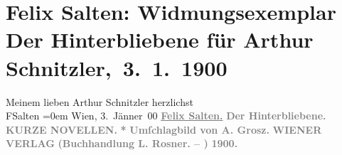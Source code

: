 

         
         \renewcommand{\erwaehntePersonen}{Personen: Adolf Grosz, Felix Salten}
         \renewcommand{\erwaehnteInstitutionen}{Institutionen: Buchhandlung L. Rosner, Wiener Verlag}
         \renewcommand{\erwaehnteOrte}{Orte: Wien}
         \renewcommand{\erwaehnteWerke}{Werke: Der Hinterbliebene. Kurze Novellen}
               \section[ Felix Salten: Widmungsexemplar Der Hinterbliebene für Arthur Schnitzler, 3. 1. 1900]{ Felix Salten: Widmungsexemplar Der Hinterbliebene für Arthur
               Schnitzler, 3. 1. 1900}\nopagebreak{}\rehead{ }\begin{ledgroupsized}[t]{13cm}\normalsize\beginnumbering \toendnotes[C]{\smallbreak\pagebreak[2]} 
\toendnotes[C]{\smallbreak}\pstart
           \noindent{}{\pb}Meinem lieben Arthur Schnitzler\pend
           \pstart
           herzlichst{\\[\baselineskip]}\spacefill\mbox{FSalten}\pend
           \leftskip=0em{}\pstart
           Wien, 3. Jänner 00\pend
           {\bigskip}\pstart
           \noindent{}\textcolor{gray}{\textbf{\textbf{\uline{Felix Salten.}}}}\pend
           \pstart
           \centering{}\textcolor{gray}{\textbf{\textbf{Der Hinterbliebene.}}}\pend
           \pstart
           \noindent{}\centering{}\textcolor{gray}{\textbf{KURZE NOVELLEN.}}\pend
           \pstart
           \noindent{}\centering{}\textcolor{gray}{\textbf{*}}\pend
           \pstart
           \noindent{}\centering{}\textcolor{gray}{\textbf{Umſchlagbild von A.
                     Grosz.}}\pend
           {\bigskip}\pstart
           \noindent{}\centering{}\textcolor{gray}{\textbf{WIENER VERLAG}}\pend
           \pstart
           \noindent{}\centering{}\textcolor{gray}{\textbf{\textbf{(Buchhandlung L.
                        Rosner. – \label{K_L03048-1v}\label{K_L03048-1h})}}}\pend
           \pstart
           \noindent{}\centering{}\textcolor{gray}{\textbf{\textbf{1900.}}}\pend
           
         
         \endnumbering{}\end{ledgroupsized}  \newcommand{\dateiname}{L03048}\newcommand{\titel}{Felix Salten: Widmungsexemplar Der Hinterbliebene für Arthur Schnitzler, 3. 1. 1900}\newcommand{\editorInnen}{Martin Anton Müller und Laura Untner}
      